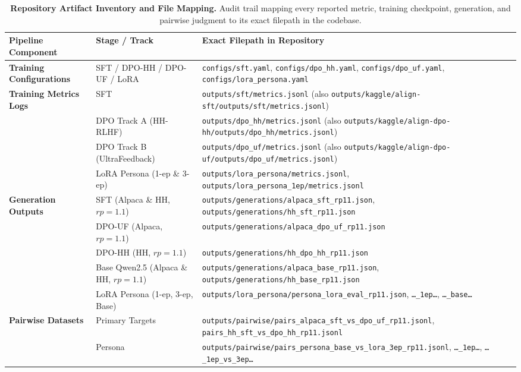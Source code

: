\begin{table}[t]
\centering
\small
\caption{\textbf{Repository Artifact Inventory and File Mapping.} Audit trail mapping every reported metric, training checkpoint, generation, and pairwise judgment to its exact filepath in the codebase.}
\label{tab:artifacts}
\begin{tabularx}{\textwidth}{llX}
\toprule
\textbf{Pipeline Component} & \textbf{Stage / Track} & \textbf{Exact Filepath in Repository} \\
\midrule
\textbf{Training Configurations} & SFT / DPO-HH / DPO-UF / LoRA & \texttt{configs/sft.yaml}, \texttt{configs/dpo\_hh.yaml}, \texttt{configs/dpo\_uf.yaml}, \texttt{configs/lora\_persona.yaml} \\
\textbf{Training Metrics Logs} & SFT & \texttt{outputs/sft/metrics.jsonl} (also \texttt{outputs/kaggle/align-sft/outputs/sft/metrics.jsonl}) \\
& DPO Track A (HH-RLHF) & \texttt{outputs/dpo\_hh/metrics.jsonl} (also \texttt{outputs/kaggle/align-dpo-hh/outputs/dpo\_hh/metrics.jsonl}) \\
& DPO Track B (UltraFeedback) & \texttt{outputs/dpo\_uf/metrics.jsonl} (also \texttt{outputs/kaggle/align-dpo-uf/outputs/dpo\_uf/metrics.jsonl}) \\
& LoRA Persona (1-ep \& 3-ep) & \texttt{outputs/lora\_persona/metrics.jsonl}, \texttt{outputs/lora\_persona\_1ep/metrics.jsonl} \\
\textbf{Generation Outputs} & SFT (Alpaca \& HH, $rp=1.1$) & \texttt{outputs/generations/alpaca\_sft\_rp11.json}, \texttt{outputs/generations/hh\_sft\_rp11.json} \\
& DPO-UF (Alpaca, $rp=1.1$) & \texttt{outputs/generations/alpaca\_dpo\_uf\_rp11.json} \\
& DPO-HH (HH, $rp=1.1$) & \texttt{outputs/generations/hh\_dpo\_hh\_rp11.json} \\
& Base Qwen2.5 (Alpaca \& HH, $rp=1.1$) & \texttt{outputs/generations/alpaca\_base\_rp11.json}, \texttt{outputs/generations/hh\_base\_rp11.json} \\
& LoRA Persona (1-ep, 3-ep, Base) & \texttt{outputs/lora\_persona/persona\_lora\_eval\_rp11.json}, \texttt{\dots\_1ep\dots}, \texttt{\dots\_base\dots} \\
\textbf{Pairwise Datasets} & Primary Targets & \texttt{outputs/pairwise/pairs\_alpaca\_sft\_vs\_dpo\_uf\_rp11.jsonl}, \texttt{pairs\_hh\_sft\_vs\_dpo\_hh\_rp11.jsonl} \\
& Persona & \texttt{outputs/pairwise/pairs\_persona\_base\_vs\_lora\_3ep\_rp11.jsonl}, \texttt{\dots\_1ep\dots}, \texttt{\dots\_1ep\_vs\_3ep\dots} \\

\end{tabularx}
\end{table}
